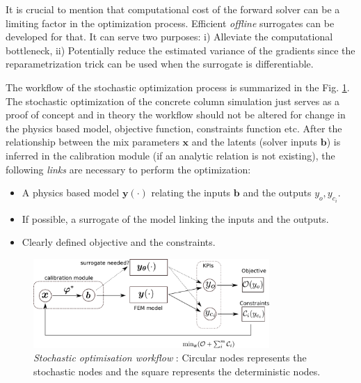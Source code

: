 \documentclass[a4paper,11pt]{article}
\begin{document}
 It is crucial to mention that computational cost of the forward solver can be a limiting factor in the optimization process. Efficient \textit{offline} surrogates can be developed for that. It can serve two purposes: i) Alleviate the computational bottleneck, ii) Potentially reduce the estimated variance of the gradients since the reparametrization trick can be used when  the surrogate is differentiable. 
 
 
The workflow of the stochastic optimization process is summarized in the Fig. \ref{fig:stochastic_opt_flowchart}. The stochastic optimization of the concrete column simulation just serves as a proof of concept and in theory the workflow should not be altered for change in the physics based model, objective function, constraints function etc. After the relationship between the mix parameters $\bm x$ and the latents (solver inputs $\bm b$) is inferred in the calibration module (if an analytic relation is not existing), the following \emph{links} are necessary to perform the optimization:
\begin{itemize}
	\item A physics based model $\bm y(\cdot)$ relating the inputs $\bm b$ and the outputs $y_o, y_{c_i}$.
	\item If possible, a surrogate of the model linking the inputs and the outputs.
	\item Clearly defined objective and the constraints. 
\end{itemize} 

 
 
 \begin{figure}[!htpb]
 	\centering
 	\includegraphics[width=0.8\textwidth]{fig/Optimisation_flowchart.pdf}
 	\caption{\emph{Stochastic optimisation workflow} : Circular nodes represents the stochastic nodes and the square represents the deterministic nodes.}
 	\label{fig:stochastic_opt_flowchart}
 \end{figure}
 



\newpage
\nocite{*}

%
\footnotesize{}
\end{document}
